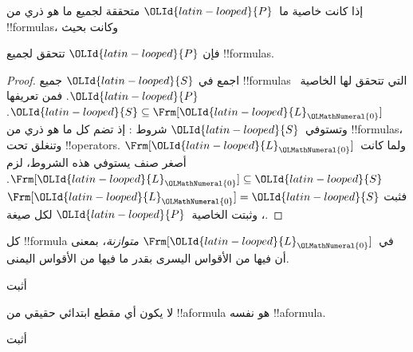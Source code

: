 \documentclass[../../../include/open-logic-section]{subfiles}
\begin{document}


\begin{thm}
  إذا كانت خاصية ما~${\OLId{latin-looped}{P}}$ متحققة لجميع ما هو ذري من !!{formula}s، وكانت
  بحيث
  \begin{enumerate}
  \end{enumerate}
  فإن ${\OLId{latin-looped}{P}}$ تتحقق لجميع !!{formula}s.
\end{thm}

\begin{proof}
  اجمع في ${\OLId{latin-looped}{S}}$ جميع !!{formula}s التي تتحقق لها الخاصية~${\OLId{latin-looped}{P}}$. فمن تعريفها
  ${\OLId{latin-looped}{S}} \subseteq \Frm[{\OLId{latin-looped}{L}}_{\OLMathNumeral{0}}]$. وتستوفي~${\OLId{latin-looped}{S}}$ شروط
  : إذ تضم كل ما هو ذري من
  !!{formula}s، وتنغلق تحت !!{operator}s. ولما كانت~$\Frm[{\OLId{latin-looped}{L}}_{\OLMathNumeral{0}}]$ أصغر صنف يستوفي هذه الشروط، لزم
  $\Frm[{\OLId{latin-looped}{L}}_{\OLMathNumeral{0}}] \subseteq {\OLId{latin-looped}{S}}$. فثبت $\Frm[{\OLId{latin-looped}{L}}_{\OLMathNumeral{0}}] = {\OLId{latin-looped}{S}}$، وثبتت الخاصية~${\OLId{latin-looped}{P}}$ لكل صيغة.
\end{proof}

\begin{prop}
   كل !!{formula} في~$\Frm[{\OLId{latin-looped}{L}}_{\OLMathNumeral{0}}]$ \emph{متوازنة}، بمعنى أن فيها من
   الأقواس اليسرى بقدر ما فيها من الأقواس اليمنى.
\end{prop}

\begin{prob}
أثبت 
\end{prob}

\begin{prop} 
لا يكون أي مقطع ابتدائي حقيقي من !!a{formula} هو نفسه !!a{formula}.
\end{prop}

\begin{prob}
  أثبت 
\end{prob}
\end{document}
